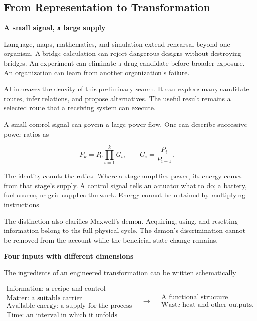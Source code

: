 \documentclass[11pt,openany]{book}
\newcommand{\subhead}[1]{\par\medskip\noindent\textbf{#1}\par\nobreak\smallskip}
\begin{document}
\subsection{From Representation to Transformation}

\subhead{A small signal, a large supply}

Language, maps, mathematics, and simulation extend rehearsal beyond one organism. A bridge calculation can reject dangerous designs without destroying bridges. An experiment can eliminate a drug candidate before broader exposure. An organization can learn from another organization's failure.

AI increases the density of this preliminary search. It can explore many candidate routes, infer relations, and propose alternatives. The useful result remains a selected route that a receiving system can execute.

A small control signal can govern a large power flow. One can describe successive power ratios as

\begin{equation}
P_k=P_0\prod_{i=1}^{k}G_i,\qquad G_i=\frac{P_i}{P_{i-1}}.
\end{equation}

The identity counts the ratios. Where a stage amplifies power, its energy comes from that stage's supply. A control signal tells an actuator what to do; a battery, fuel source, or grid supplies the work. Energy cannot be obtained by multiplying instructions.

The distinction also clarifies Maxwell's demon. Acquiring, using, and resetting information belong to the full physical cycle. The demon's discrimination cannot be removed from the account while the beneficial state change remains.

\subhead{Four inputs with different dimensions}

The ingredients of an engineered transformation can be written schematically:

\begin{equation}
\begin{gathered}
\text{Information: a recipe and control}\\
\text{Matter: a suitable carrier}\\
\text{Available energy: a supply for the process}\\
\text{Time: an interval in which it unfolds}
\end{gathered}
\quad\longrightarrow\quad
\begin{gathered}
\text{A functional structure}\\
\text{Waste heat and other outputs}.
\end{gathered}
\label{eq:conservation}
\end{equation}
\end{document}
